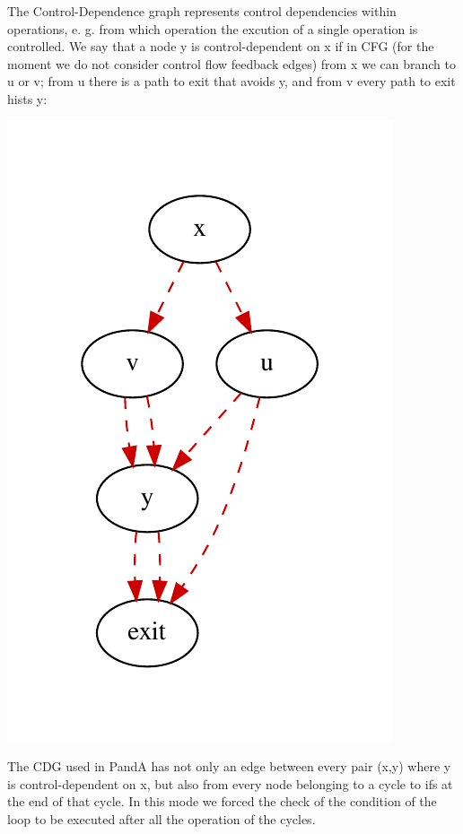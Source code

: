The Control-\/\+Dependence graph represents control dependencies within operations, e. g. from which operation the excution of a single operation is controlled. We say that a node y is control-\/dependent on x if in C\+FG (for the moment we do not consider control flow feedback edges) from x we can branch to u or v; from u there is a path to exit that avoids y, and from v every path to exit hists y\+: 
\begin{DoxyImageNoCaption}
  \mbox{\includegraphics[width=\textwidth,height=\textheight/2,keepaspectratio=true]{dot_inline_dotgraph_2}}
\end{DoxyImageNoCaption}
 The C\+DG used in PandA has not only an edge between every pair (x,y) where y is control-\/dependent on x, but also from every node belonging to a cycle to ifs at the end of that cycle. In this mode we forced the check of the condition of the loop to be executed after all the operation of the cycles.

